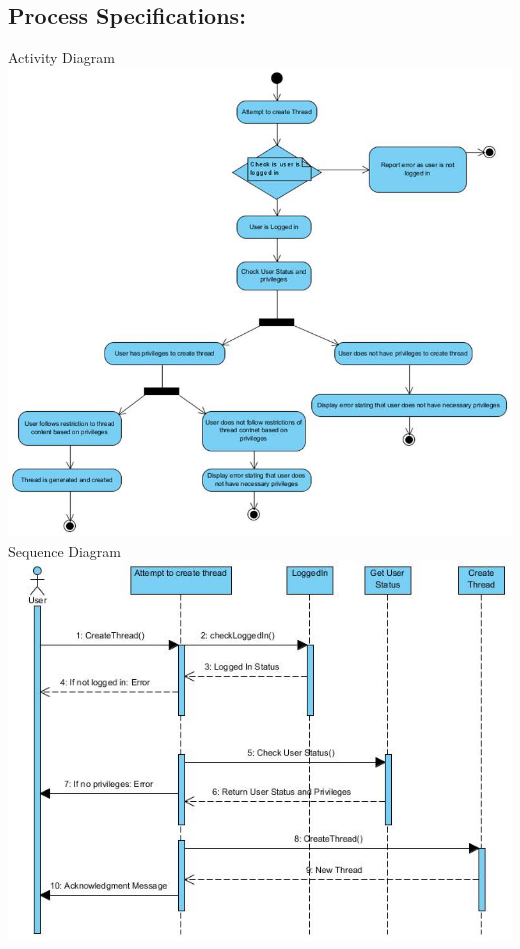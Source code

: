 \documentclass[a4paper,11pt]{article}
\begin{document}
\subsection{Process Specifications:} 
Activity Diagram\\
\includegraphics[width=\linewidth]{./Images/CRUDThread/Diagrams/3.jpg}
\newpage
Sequence Diagram\\
\includegraphics[width=1\linewidth]{./Images/CRUDThread/Diagrams/4.jpg}\\
\end{document}
